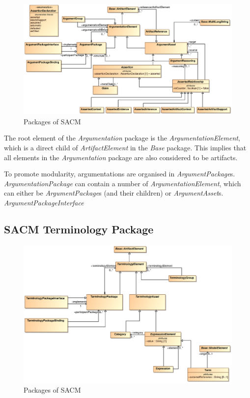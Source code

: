 \begin{figure}
	\centering
	\includegraphics[width=1\linewidth]{fig/Argumentation.eps}
	\caption{Packages of SACM}
	\label{fig:arg}
\end{figure}
The root element of the \textit{Argumentation} package is the \textit{ArgumentationElement}, which is a direct child of \textit{ArtifactElement} in the \textit{Base} package. This implies that all elements in the \textit{Argumentation} package are also considered to be artifacts. 

To promote modularity, argumentations are organised in \textit{ArgumentPackage}s. \textit{ArgumentationPackage} can contain a number of \textit{ArgumentationElement}, which can either be \textit{ArgumentPackage}s (and their children) or \textit{ArgumentAsset}s. \textit{ArgumentPackageInterface} 

\subsection{SACM Terminology Package}
\label{sec:termPack}

\begin{figure}
	\centering
	\includegraphics[width=1\linewidth]{fig/Terminology.eps}
	\caption{Packages of SACM}
	\label{fig:term}
\end{figure}
